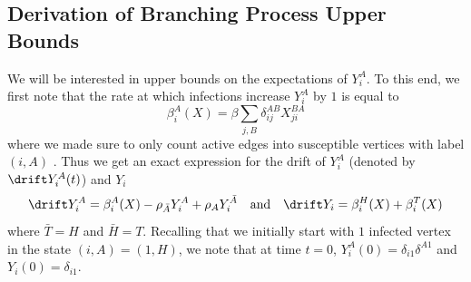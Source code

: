 \documentclass[11pt]{article}
\begin{document}
\subsection{Derivation of Branching Process Upper Bounds}
\label{sec:bp_upper_bounds}

We will be interested in upper bounds on the expectations of $Y_i^A$.
To this end, we first note that the rate at which infections increase $Y_i^A$ by $1$ is equal to
$$
\beta_i^A(X)=\beta \sum_{j,B}\delta_{ij}^{AB}X_{ji}^{BA}
$$
where we made sure to only count active edges into susceptible vertices with label $(i,A)$ . Thus we get an exact expression for the drift of $Y_i^A$ (denoted by $\drift Y_i^A(t)$) and $Y_i$
$$
\drift Y_i^A=\beta_i^A(X) -\rho_{\bar A} Y_i^A +\rho_{ A}Y_i^{\bar A}
\quad\text{and}\quad \drift Y_i=\beta_i^H(X)+\beta_i^{ T}(X)
$$
where $\bar T=H$ and $\bar H=T$. Recalling that we initially start with $1$ infected vertex in the state $(i,A)=(1,H)$, we note that
at time $t=0$, $Y_i^A(0)=\delta_{i1}\delta^{A1}$ and $Y_i(0)=\delta_{i1}$.
\end{document}
